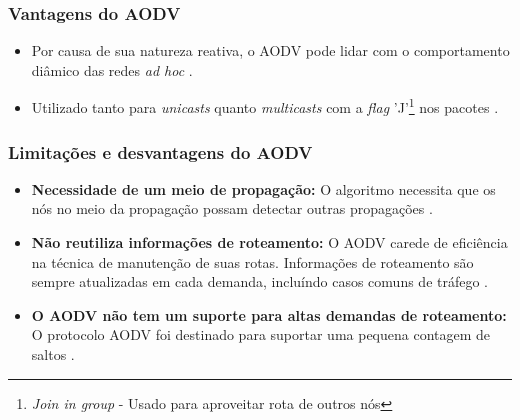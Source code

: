 \subsubsection{Vantagens do AODV}
\begin{itemize}
	\item Por causa de sua natureza reativa, o AODV pode lidar com o comportamento di\^amico das redes \textit{ad hoc} \cite{schwingenschlogl}.
	\item Utilizado tanto para \textit{unicasts} quanto \textit{multicasts} com a \textit{flag} 'J'\footnote{\textit{Join in group} - Usado para aproveitar rota de outros n\'os} nos pacotes \cite{ramachandranTech}.
\end{itemize}

\subsubsection{Limita\c{c}\~oes e desvantagens do AODV}
\begin{itemize}
	\item \textbf{Necessidade de um meio de propaga\c{c}\~ ao:} O algoritmo necessita que os n\'os no meio da propaga\c{c}\~ ao possam detectar outras propaga\c{c}\~oes \cite{gorantala}.
	\item \textbf{N\~ao reutiliza informa\c{c}\~oes de roteamento:} O AODV carede de efici\^encia na t\'ecnica de manuten\c{c}\~ao de suas rotas. Informa\c{c}\~oes de roteamento s\~ao sempre atualizadas em cada demanda, inclu\'indo casos comuns de tr\'afego \cite{ramachandran}.
	\item \textbf{O AODV n\~ao tem um suporte para altas demandas de roteamento:} O protocolo AODV foi destinado para suportar uma pequena contagem de saltos \cite{ramachandran}.
\end{itemize}
